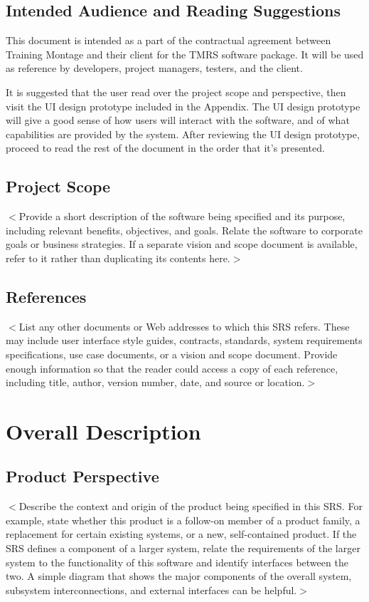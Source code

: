 \documentclass{scrreprt}
\begin{document}
\section{Intended Audience and Reading Suggestions}
This document is intended as a part of the contractual agreement between Training
Montage and their client for the TMRS software package. It will be used as reference
by developers, project managers, testers, and the client.

It is suggested that the user read over the project scope and perspective, then
visit the UI design prototype included in the Appendix. The UI design prototype 
will give a good sense of how users will interact with the software, and of what
capabilities are provided by the system. After reviewing the UI design prototype,
proceed to read the rest of the document in the order that it's presented.

\section{Project Scope}
$<$Provide a short description of the software being specified and its purpose, 
including relevant benefits, objectives, and goals. Relate the software to 
corporate goals or business strategies. If a separate vision and scope document 
is available, refer to it rather than duplicating its contents here.$>$

\section{References}
$<$List any other documents or Web addresses to which this SRS refers. These may 
include user interface style guides, contracts, standards, system requirements 
specifications, use case documents, or a vision and scope document. Provide 
enough information so that the reader could access a copy of each reference, 
including title, author, version number, date, and source or location.$>$


\chapter{Overall Description}

\section{Product Perspective}
$<$Describe the context and origin of the product being specified in this SRS.  
For example, state whether this product is a follow-on member of a product 
family, a replacement for certain existing systems, or a new, self-contained 
product. If the SRS defines a component of a larger system, relate the 
requirements of the larger system to the functionality of this software and 
identify interfaces between the two. A simple diagram that shows the major 
components of the overall system, subsystem interconnections, and external 
interfaces can be helpful.$>$
\end{document}

